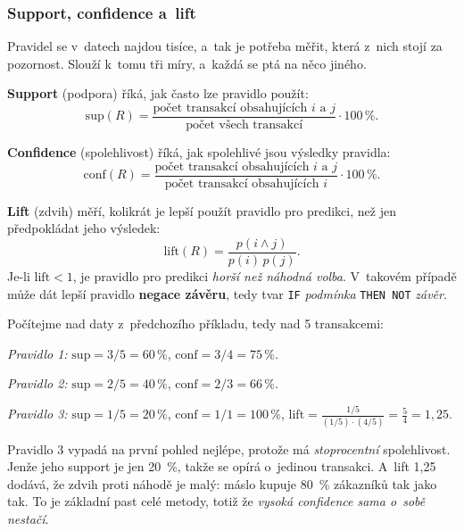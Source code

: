 \documentclass[11pt,a4paper]{article}
\theoremstyle{definition}
\begin{document}
\subsubsection{Support, confidence a~lift}

Pravidel se v~datech najdou tisíce, a~tak je potřeba měřit, která z~nich stojí za pozornost.
Slouží k~tomu tři míry, a~každá se ptá na něco jiného.

\begin{defbox}
\textbf{Support} (podpora) říká, jak často lze pravidlo použít:
\[ \mathrm{sup}(R)=\frac{\text{počet transakcí obsahujících } i \text{ a } j}
   {\text{počet všech transakcí}}\cdot 100\,\%. \]

\textbf{Confidence} (spolehlivost) říká, jak spolehlivé jsou výsledky pravidla:
\[ \mathrm{conf}(R)=\frac{\text{počet transakcí obsahujících } i \text{ a } j}
   {\text{počet transakcí obsahujících } i}\cdot 100\,\%. \]

\textbf{Lift} (zdvih) měří, kolikrát je lepší použít pravidlo pro predikci, než jen
předpokládat jeho výsledek:
\[ \mathrm{lift}(R)=\frac{p(i\wedge j)}{p(i)\,p(j)}. \]
Je-li $\mathrm{lift}<1$, je pravidlo pro predikci \emph{horší než náhodná volba}. V~takovém
případě může dát lepší pravidlo \textbf{negace závěru}, tedy tvar \texttt{IF} \emph{podmínka}
\texttt{THEN NOT} \emph{závěr}.
\end{defbox}

\begin{defbox}
Počítejme nad daty z~předchozího příkladu, tedy nad 5 transakcemi:

\emph{Pravidlo 1:} 
$\mathrm{sup}=3/5=60\,\%$, $\mathrm{conf}=3/4=75\,\%$.

\emph{Pravidlo 2:} 
$\mathrm{sup}=2/5=40\,\%$, $\mathrm{conf}=2/3=66\,\%$.

\emph{Pravidlo 3:} 
$\mathrm{sup}=1/5=20\,\%$, $\mathrm{conf}=1/1=100\,\%$,
$\mathrm{lift}=\frac{1/5}{(1/5)\cdot(4/5)}=\frac54=1{,}25$.

Pravidlo 3 vypadá na první pohled nejlépe, protože má \emph{stoprocentní} spolehlivost. Jenže
jeho support je jen 20~\%, takže se opírá o~jedinou transakci. A~lift 1,25 dodává, že zdvih
proti náhodě je malý: máslo kupuje 80~\% zákazníků tak jako tak. To je základní past celé
metody, totiž že \emph{vysoká confidence sama o~sobě nestačí}.
\end{defbox}
\end{document}
